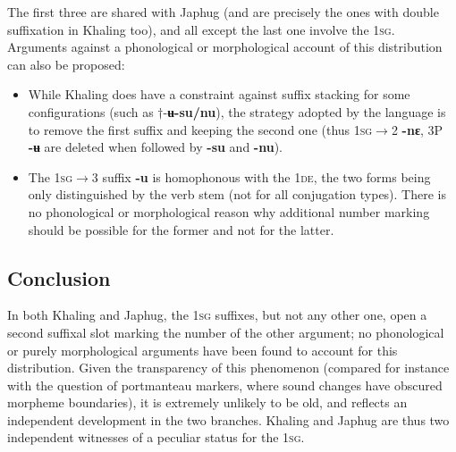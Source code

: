 \documentclass{article}
\newcommand{\ipa}[1]{{\phon\textbf{#1}}}
\begin{document}
The first three are shared with Japhug (and are precisely the ones with double suffixation in Khaling too), and all except the last one involve the \textsc{1sg}. Arguments against a phonological or morphological account of this distribution can also be proposed:

\begin{itemize}
\item While Khaling does have a constraint against suffix stacking for some configurations (such as $\dagger$-\ipa{ʉ-su/nu}), the strategy adopted by the language is to remove the first suffix and keeping the second one (thus \textsc{1sg$\rightarrow$2} \ipa{-nɛ}, 3P \ipa{-ʉ} are deleted when followed by \ipa{-su} and \ipa{-nu}).
\item The \textsc{1sg$\rightarrow$3} suffix \ipa{-u} is homophonous with the \textsc{1de}, the two forms being only distinguished by the verb stem (not for all conjugation types). There is no phonological or morphological reason why additional number marking should be  possible for the former and not for the latter.
\end{itemize}

\subsection{Conclusion}
In both Khaling and Japhug, the \textsc{1sg} suffixes, but not any other one, open a second suffixal slot marking the number of the other argument; no phonological or purely morphological arguments have been found to account for this distribution. Given  the transparency of this phenomenon (compared for instance with the question of portmanteau markers, where sound changes have obscured morpheme boundaries), it is extremely unlikely to be old, and reflects an independent development in the two branches. Khaling and Japhug are thus two independent witnesses of a peculiar status for the \textsc{1sg}.




\end{document}
